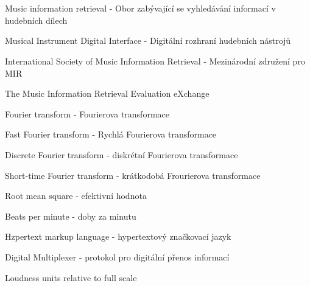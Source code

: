 \cleardoublepage
\chapter*{\listofabbrevname}
{}

\begin{acronym}[KolikMista]
		{Music information retrieval - Obor zabývající se vyhledávání informací v hudebních dílech}
	
		{Musical Instrument Digital Interface - Digitální rozhraní hudebních nástrojů}

		{International Society of Music Information Retrieval - Mezinárodní združení pro \acs*{MIR}}	

		{The Music Information Retrieval Evaluation eXchange}

		{Fourier transform - Fourierova transformace}
		
		{Fast Fourier transform - Rychlá Fourierova transformace}

		{Discrete Fourier transform - diskrétní Fourierova transformace}

		{Short-time Fourier transform - krátkodobá Frourierova transformace}
	
		{Root mean square - efektivní hodnota}

		{Beats per minute - doby za minutu}

		{Hzpertext markup language -  hypertextový značkovací jazyk}

		{Digital Multiplexer - protokol pro digitální přenos informací}
	
		{Loudness units relative to full scale}
\end{acronym}
